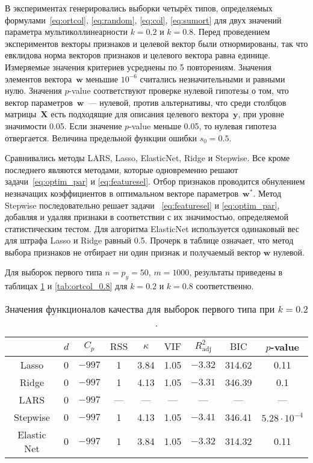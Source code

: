 \documentclass[a4paper,12pt]{article}
\newcommand{\bw}{\mathbf{w}}
\newcommand{\by}{\mathbf{y}}
\newcommand{\bX}{\mathbf{X}}
\newcommand{\vif}{\mathrm{VIF}}
\newcommand{\rss}{\mathrm{RSS}}
\newcommand{\bic}{\mathrm{BIC}}
\newcommand{\radj}{R_{\text{adj}}^2}
\begin{document}
В экспериментах генерировались выборки четырёх типов, определяемых формулами~\ref{eq:ortcol}, \ref{eq:random}, \ref{eq:col}, \ref{eq:sumort} для двух значений параметра мультиколлинеарности $k = 0.2$ и $k = 0.8$. Перед проведением экспериментов векторы признаков и целевой вектор были отнормированы, так что евклидова норма векторов признаков и целевого вектора равна единице. Измеряемые значения критериев усреднены по 5 повторениям. Значения элементов вектора~$\bw$ меньшие $10^{-6}$ считались незначительными и равными нулю. Значения $p$-value соответствуют проверке нулевой гипотезы о том, что вектор параметров~$\bw$~--- нулевой, против альтернативы, что среди столбцов матрицы~$\bX$ есть подходящие для описания целевого вектора~$\by$, при уровне значимости 0.05. Если значение $p$-value меньше 0.05, то нулевая гипотеза отвергается. Величина предельной функции ошибки $s_0 = 0.5$. 

Сравнивались методы  LARS, Lasso, ElasticNet, Ridge и Stepwise. Все кроме последнего являются методами, которые одновременно решают задачи~\eqref{eq:optim_par} и \eqref{eq:featuresel}. Отбор признаков проводится обнулением незначащих коэффициентов в оптимальном векторе параметров~$\bw^*$. Метод Stepwise последовательно решает задачи~ \eqref{eq:featuresel} и \eqref{eq:optim_par}, добавляя и удаляя признаки в соответствии с их значимостью, определяемой статистическим тестом. Для алгоритма ElasticNet используется одинаковый вес для штрафа Lasso и Ridge равный 0.5. Прочерк в таблице означает, что метод выбора признаков не отбирает ни один признак и получаемый вектор $\bw$ нулевой.

Для выборок первого типа $n = p_y = 50$, $m = 1000$, результаты приведены в таблицах \ref{tab:ortcol_0.2} и \ref{tab:ortcol_0.8} для $k = 0.2$ и $k = 0.8$ соответственно.
\begin{table}[h]
\centering
\caption{Значения функционалов качества для выборок первого типа при $k = 0.2$.}
\begin{tabular}{|c|c|c|c|c|c|c|c|c|}
\hline 
 & $d$ & $C_p$ & $\rss$ & $\kappa$ & $\vif$ & $\radj$ & $\bic$ & $p$-value \\ 
\hline 
Lasso & 0  &	$-997$ & 1 & 3.84 & 1.05 & $-3.32$ & 314.62 & 0.11 \\ 
\hline 
Ridge & 0 & $-997$ & 1 & 4.13 & 1.05 & $-3.31$ & 346.39 & 0.1 \\ 
\hline 
LARS & 0 & $-997$ & --- & --- & --- & --- & --- & --- \\ 
\hline 
Stepwise & 0 & $-997$ & 1 & 4.13 & 1.05 & $-3.41$ & 346.41 & $5.28 \cdot 10^{-4}$ \\
\hline
Elastic Net & 0 & $-997$ & 1 & 3.84 & 1.05 & $-3.32$ & 314.32 & 0.11 \\    
\hline 
\end{tabular}
\label{tab:ortcol_0.2}
\end{table}
\end{document}
